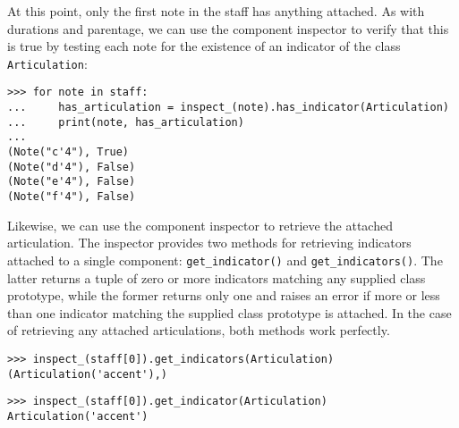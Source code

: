 \noindent At this point, only the first note in the staff has anything
attached. As with durations and parentage, we can use the component inspector
to verify that this is true by testing each note for the existence of an
indicator of the class \texttt{Articulation}:

\begin{comment}
<abjad>
for note in staff:
    has_articulation = inspect_(note).has_indicator(Articulation)
    print(note, has_articulation)

</abjad>
\end{comment}

\begin{abjadbookoutput}
\begin{singlespacing}
\vspace{-0.5\baselineskip}
\begin{verbatim}
>>> for note in staff:
...     has_articulation = inspect_(note).has_indicator(Articulation)
...     print(note, has_articulation)
...
(Note("c'4"), True)
(Note("d'4"), False)
(Note("e'4"), False)
(Note("f'4"), False)
\end{verbatim}
\end{singlespacing}
\end{abjadbookoutput}

\noindent Likewise, we can use the component inspector to retrieve the attached
articulation. The inspector provides two methods for retrieving indicators
attached to a single component: \texttt{get\_indicator()} and
\texttt{get\_indicators()}. The latter returns a tuple of zero or more
indicators matching any supplied class prototype, while the former returns only
one and raises an error if more or less than one indicator matching the
supplied class prototype is attached. In the case of retrieving any attached
articulations, both methods work perfectly.

\begin{comment}
<abjad>[allow_exceptions]
inspect_(staff[0]).get_indicators(Articulation)
inspect_(staff[0]).get_indicator(Articulation)
</abjad>
\end{comment}

\begin{abjadbookoutput}
\begin{singlespacing}
\vspace{-0.5\baselineskip}
\begin{verbatim}
>>> inspect_(staff[0]).get_indicators(Articulation)
(Articulation('accent'),)
\end{verbatim}
\begin{verbatim}
>>> inspect_(staff[0]).get_indicator(Articulation)
Articulation('accent')
\end{verbatim}
\end{singlespacing}
\end{abjadbookoutput}

